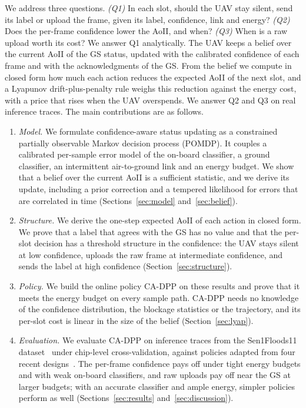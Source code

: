 \documentclass[journal]{IEEEtran}
\theoremstyle{remark}
\begin{document}
We address three questions. \emph{(Q1)} In each slot, should the UAV stay silent, send its label or upload the frame, given its label, confidence, link and energy? \emph{(Q2)} Does the per-frame confidence lower the AoII, and when? \emph{(Q3)} When is a raw upload worth its cost? We answer Q1 analytically. The UAV keeps a belief over the current AoII of the GS status, updated with the calibrated confidence of each frame and with the acknowledgments of the GS. From the belief we compute in closed form how much each action reduces the expected AoII of the next slot, and a Lyapunov drift-plus-penalty rule weighs this reduction against the energy cost, with a price that rises when the UAV overspends. We answer Q2 and Q3 on real inference traces. The main contributions are as follows.
\begin{enumerate}
\item \emph{Model.} We formulate confidence-aware status updating as a constrained partially observable Markov decision process (POMDP). It couples a calibrated per-sample error model of the on-board classifier, a ground classifier, an intermittent air-to-ground link and an energy budget. We show that a belief over the current AoII is a sufficient statistic, and we derive its update, including a prior correction and a tempered likelihood for errors that are correlated in time (Sections~\ref{sec:model} and~\ref{sec:belief}).
\item \emph{Structure.} We derive the one-step expected AoII of each action in closed form. We prove that a label that agrees with the GS has no value and that the per-slot decision has a threshold structure in the confidence: the UAV stays silent at low confidence, uploads the raw frame at intermediate confidence, and sends the label at high confidence (Section~\ref{sec:structure}).
\item \emph{Policy.} We build the online policy CA-DPP on these results and prove that it meets the energy budget on every sample path. CA-DPP needs no knowledge of the confidence distribution, the blockage statistics or the trajectory, and its per-slot cost is linear in the size of the belief (Section~\ref{sec:lyap}).
\item \emph{Evaluation.} We evaluate CA-DPP on inference traces from the Sen1Floods11 dataset~\cite{bonafilia2020sen1floods11} under chip-level cross-validation, against policies adapted from four recent designs~\cite{zakeri2023aoiieh,gan2025taoi,pehlivanoglu2026orbit,basnayaka2025aomi}. The per-frame confidence pays off under tight energy budgets and with weak on-board classifiers, and raw uploads pay off near the GS at larger budgets; with an accurate classifier and ample energy, simpler policies perform as well (Sections~\ref{sec:results} and~\ref{sec:discussion}).
\end{enumerate}
\end{document}
